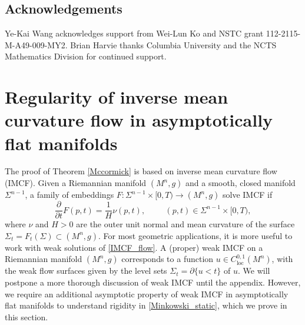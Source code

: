 \documentclass[12pt,twoside]{article}
\theoremstyle{plain}
\theoremstyle{definition}
\theoremstyle{remark}
\numberwithin{equation}{section}
\begin{document}
\subsection*{Acknowledgements}
Ye-Kai Wang acknowledges support from Wei-Lun Ko and NSTC grant 112-2115-M-A49-009-MY2. Brian Harvie thanks Columbia University and the NCTS Mathematics Division for continued support.


\section{Regularity of inverse mean curvature flow in asymptotically flat manifolds}
The proof of Theorem \ref{Mccormick} is based on inverse mean curvature flow (IMCF). Given a Riemannian manifold $(M^{n},g)$ and a smooth, closed manifold $\Sigma^{n-1}$, a family of embeddings $F: \Sigma^{n-1} \times [0,T) \rightarrow (M^{n},g)$ solve IMCF if
\begin{equation} \label{IMCF_flow}
    \frac{\partial}{\partial t} F (p,t) = \frac{1}{H} \nu(p,t), \hspace{1cm} (p,t) \in \Sigma^{n-1} \times [0,T),
\end{equation}
where $\nu$ and $H> 0$ are the outer unit normal and mean curvature of the surface $\Sigma_{t}=F_{t}(\Sigma) \subset (M^{n},g)$. For most geometric applications, it is more useful to work with weak solutions of \eqref{IMCF_flow}. A (proper) weak IMCF on a Riemannian manifold $(M^{n},g)$ corresponds to a function $u \in C^{0,1}_{\text{loc}} (M^{n})$, with the weak flow surfaces given by the level sets $\Sigma_{t}=\partial \{ u < t\}$ of $u$. We will postpone a more thorough discussion of weak IMCF until the appendix. However, we require an additional asymptotic property of weak IMCF in asymptotically flat manifolds to understand rigidity in \eqref{Minkowski_static}, which we prove in this section.
\end{document}
